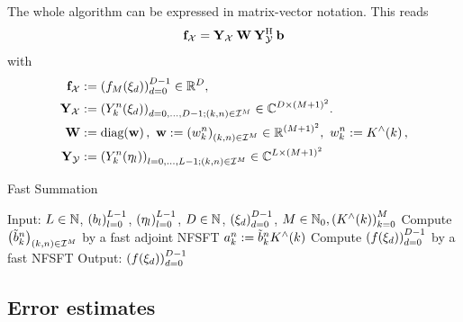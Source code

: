 \begin{remark}
	The whole algorithm can be expressed in matrix-vector notation. This reads
	\[
	  \mathbf{f}_{\mathcal{X}} = \mathbf{Y}_{\mathcal{X}} \: \mathbf{W} \:
	  \mathbf{Y}_{\mathcal{Y}}^{\text{\rm{H}}} \: \mathbf{b}
	\]
	with
	\begin{align}
	  \nonumber
	  \mathbf{f}_{\mathcal{X}} & := \left(f_{M}{\hspace{-0.4ex}}\left(\mathbf{\xi}_{d}\right)\right)_{d=0}^{D-1} \in \mathbb{R}^D,\\
	  \nonumber
	  \mathbf{Y}_{\mathcal{X}} & := \left(Y_k^n{\hspace{-0.4ex}}\left(\mathbf{\xi}_{d}\right)\right)_{d=0,\ldots,D-1; 
	  \left(k,n\right) \in \mathcal{I}^M} \in \mathbb{C}^{D \times \left(M+1\right)^2}. \\
	  \nonumber
	  \mathbf{W} & := \text{\rm{diag}}{\hspace{-0.4ex}}\left(\mathbf{w}\right),\ \mathbf{w} := \left(w_{k}^n\right)_{\left(k,n\right) \in 
	  \mathcal{I}^M} \in \mathbb{R}^{(M+1)^2},\ w_{k}^n := K^{\wedge}{\hspace{-0.4ex}}\left(k\right), \\
	  \nonumber
	  \mathbf{Y}_{\mathcal{Y}} & := \left(Y_k^n{\hspace{-0.4ex}}\left(\mathbf{\eta}_{l}\right)\right)_{l=0,\ldots,L-1;
	  \left(k,n\right) \in \mathcal{I}^M} \in \mathbb{C}^{L \times \left(M+1\right)^2}
	\end{align}
\end{remark}

\begin{algorithm}[tb]
  \caption{Fast Summation}
  \label{Applications:Algorithm:FastSummation}    
  \begin{algorithmic}
    \STATE  Input:  $L \in \mathbb{N}$, $\left(b_{l}\right)_{l=0}^{L-1}$, 
    $\left(\mathbf{\eta}_{l}\right)_{l=0}^{L-1}$, $D \in \mathbb{N}$, 
    $\left(\mathbf{\xi}_{d}\right)_{d=0}^{D-1}$, $M \in \mathbb{N}_{0}, 
    \left(K^{\wedge}{\hspace{-0.4ex}}\left(k\right)\right)_{k=0}^M$
    \STATE
    \STATE Compute $\left(\tilde{b}_{k}^n\right)_{\left(k,n\right) \in \mathcal{I}^M}$ 
    by a fast adjoint NFSFT
    \STATE 
        \STATE $a_{k}^n := \tilde{b}_{k}^n K^{\wedge}{\hspace{-0.4ex}}\left(k\right)$
      \ENDFOR
    \ENDFOR
    \STATE
    \STATE Compute $\left(f{\hspace{-0.4ex}}\left(\mathbf{\xi}_{d}\right)\right)_{d=0}^{D-1}$ by a fast NFSFT
    \STATE
    \STATE Output: $\left(f{\hspace{-0.4ex}}\left(\mathbf{\xi}_{d}\right)\right)_{d=0}^{D-1}$
\end{algorithmic}
\end{algorithm}

\subsection{Error estimates}

